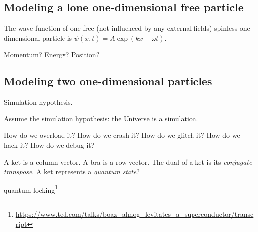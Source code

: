 
\subsection{Modeling a lone one-dimensional free particle}

The wave function of one free (not influenced by any external fields) spinless one-dimensional particle is
\( \psi(x,t) = A \exp(k x - \omega t) \).

Momentum? Energy? Position?

\subsection{Modeling two one-dimensional particles}

Simulation hypothesis.

Assume the simulation hypothesis: the Universe is a simulation.

How do we overload it?
How do we crash it?
How do we glitch it?
How do we hack it?
How do we debug it?

A ket is a column vector. A bra is a row vector. The dual of a ket is its \emph{conjugate transpose}.
A ket represents a \emph{quantum state}?

quantum locking\footnote{\url{https://www.ted.com/talks/boaz_almog_levitates_a_superconductor/transcript}}
